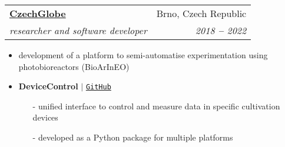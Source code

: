 \documentclass[letterpaper,11pt]{article}
\makeatletter
\newcommand{\resumeSubheading}[4]{
  \vspace{-2pt}\item
    \begin{tabular*}{0.97\textwidth}[t]{l@{\extracolsep{\fill}}r}
      \textbf{#1} & #2 \\
      \textit{\small#3} & \textit{\small #4} \\
    \end{tabular*}\vspace{-7pt}
}
\makeatother
\begin{document}
  \vspace{10pt}

  \resumeSubheading
  {\href{http://czechglobe.cz/en/}{CzechGlobe}}{Brno, Czech Republic}
  {researcher and software developer}{2018 \textbf{--} 2022}
  \small{
    \begin{itemize}
      \item development of a platform to semi-automatise experimentation using photobioreactors (BioArInEO)
      \item \textbf{DeviceControl} $|$ \href{https://github.com/SmartBioTech/DeviceControl}{\color{blue}\texttt{GitHub}} \vspace{-2pt}
      \begin{itemize}
        \item[-] unified interface to control and measure data in specific cultivation devices \vspace{-2pt}
        \item[-] developed as a Python package for multiple platforms \vspace{-2pt}
      \end{itemize}
    \end{itemize}
  }

  \vspace{10pt}
    
\end{document}
